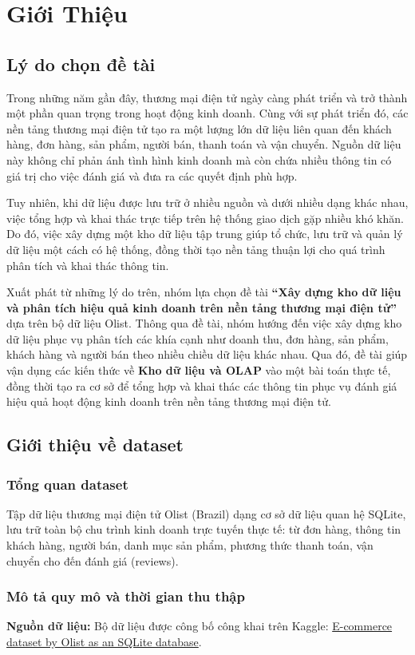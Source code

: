 \newpage
\section{Giới Thiệu}
\subsection{Lý do chọn đề tài}
Trong những năm gần đây, thương mại điện tử ngày càng phát triển và trở thành một phần quan trọng trong hoạt động kinh doanh. Cùng với sự phát triển đó, các nền tảng thương mại điện tử tạo ra một lượng lớn dữ liệu liên quan đến khách hàng, đơn hàng, sản phẩm, người bán, thanh toán và vận chuyển. Nguồn dữ liệu này không chỉ phản ánh tình hình kinh doanh mà còn chứa nhiều thông tin có giá trị cho việc đánh giá và đưa ra các quyết định phù hợp.

Tuy nhiên, khi dữ liệu được lưu trữ ở nhiều nguồn và dưới nhiều dạng khác nhau, việc tổng hợp và khai thác trực tiếp trên hệ thống giao dịch gặp nhiều khó khăn. Do đó, việc xây dựng một kho dữ liệu tập trung giúp tổ chức, lưu trữ và quản lý dữ liệu một cách có hệ thống, đồng thời tạo nền tảng thuận lợi cho quá trình phân tích và khai thác thông tin.

Xuất phát từ những lý do trên, nhóm lựa chọn đề tài \textbf{“Xây dựng kho dữ liệu và phân tích hiệu quả kinh doanh trên nền tảng thương mại điện tử”} dựa trên bộ dữ liệu Olist. Thông qua đề tài, nhóm hướng đến việc xây dựng kho dữ liệu phục vụ phân tích các khía cạnh như doanh thu, đơn hàng, sản phẩm, khách hàng và người bán theo nhiều chiều dữ liệu khác nhau. Qua đó, đề tài giúp vận dụng các kiến thức về \textbf{Kho dữ liệu và OLAP} vào một bài toán thực tế, đồng thời tạo ra cơ sở để tổng hợp và khai thác các thông tin phục vụ đánh giá hiệu quả hoạt động kinh doanh trên nền tảng thương mại điện tử.
\subsection{Giới thiệu về dataset}
\subsubsection{Tổng quan dataset}
Tập dữ liệu thương mại điện tử Olist (Brazil) dạng cơ sở dữ liệu quan hệ SQLite, lưu trữ toàn bộ chu trình kinh doanh trực tuyến thực tế: từ đơn hàng, thông tin khách hàng, người bán, danh mục sản phẩm, phương thức thanh toán, vận chuyển cho đến đánh giá (reviews).
\subsubsection{Mô tả quy mô và thời gian thu thập}
\textbf{Nguồn dữ liệu:} Bộ dữ liệu được công bố công khai trên Kaggle: \href{https://www.kaggle.com/datasets/terencicp/e-commerce-dataset-by-olist-as-an-sqlite-database}{E-commerce dataset by Olist as an SQLite database}.

